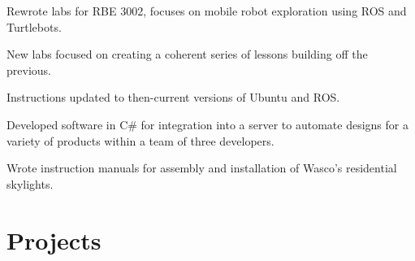 \documentclass[letterpaper]{deedy-resume} %
\begin{document}
\begin{minipage}[t]{0.66\textwidth}
\sectionspace %



\begin{tightitemize}
\item Rewrote labs for RBE 3002, focuses on mobile robot exploration using ROS and Turtlebots.
\item New labs focused on creating a coherent series of lessons building off the previous.
\item Instructions updated to then-current versions of Ubuntu and ROS.
\end{tightitemize}

\sectionspace %



\begin{tightitemize}
\item Developed software in C\# for integration into a server to automate designs for a variety of products within a team of three developers.
\item Wrote instruction manuals for assembly and installation of Wasco's residential skylights.
\end{tightitemize}

\sectionspace %

\end{minipage} 




\newpage %

\section{Projects}


\end{document}

